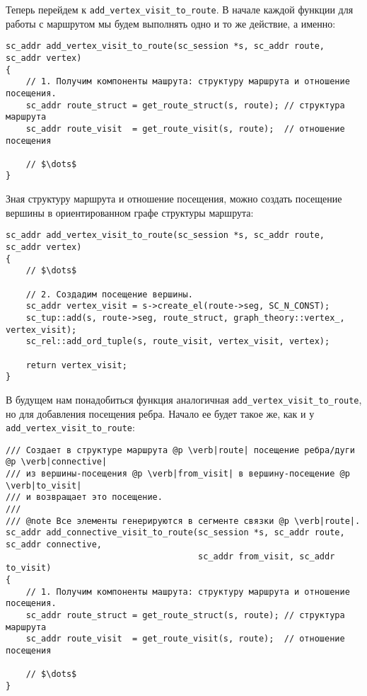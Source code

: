 Теперь перейдем к \lstinline|add_vertex_visit_to_route|. В начале
каждой функции для работы с маршрутом мы будем выполнять одно и то же
действие, а именно:

\begin{lstlisting}[texcl]
sc_addr add_vertex_visit_to_route(sc_session *s, sc_addr route, sc_addr vertex)
{
    // 1. Получим компоненты машрута: структуру маршрута и отношение посещения.
    sc_addr route_struct = get_route_struct(s, route); // структура маршрута
    sc_addr route_visit  = get_route_visit(s, route);  // отношение посещения

    // $\dots$
}
\end{lstlisting}

Зная структуру маршрута и отношение посещения, можно создать посещение
вершины в ориентированном графе структуры маршрута:

\begin{lstlisting}[texcl]
sc_addr add_vertex_visit_to_route(sc_session *s, sc_addr route, sc_addr vertex)
{
    // $\dots$

    // 2. Создадим посещение вершины.
    sc_addr vertex_visit = s->create_el(route->seg, SC_N_CONST);
    sc_tup::add(s, route->seg, route_struct, graph_theory::vertex_, vertex_visit);
    sc_rel::add_ord_tuple(s, route_visit, vertex_visit, vertex);

    return vertex_visit;
}
\end{lstlisting}

В будущем нам понадобиться функция аналогичная
\lstinline|add_vertex_visit_to_route|, но для добавления посещения
ребра. Начало ее будет такое же, как и у
\lstinline|add_vertex_visit_to_route|:

\begin{lstlisting}[texcl]
/// Создает в структуре маршрута @p \verb|route| посещение ребра/дуги @p \verb|connective|
/// из вершины-посещения @p \verb|from_visit| в вершину-посещение @p \verb|to_visit|
/// и возвращает это посещение.
///
/// @note Все элементы генерируются в сегменте связки @p \verb|route|.
sc_addr add_connective_visit_to_route(sc_session *s, sc_addr route, sc_addr connective,
                                      sc_addr from_visit, sc_addr to_visit)
{
    // 1. Получим компоненты машрута: структуру маршрута и отношение посещения.
    sc_addr route_struct = get_route_struct(s, route); // структура маршрута
    sc_addr route_visit  = get_route_visit(s, route);  // отношение посещения

    // $\dots$
}
\end{lstlisting}

